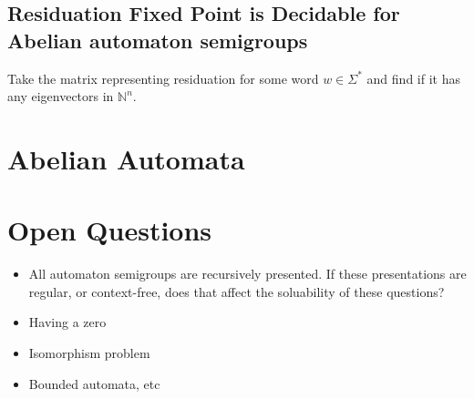 \documentclass[10pt]{article}
\begin{document}
\subsection{Residuation Fixed Point is Decidable for Abelian automaton
  semigroups}

Take the matrix representing residuation for some word
$w \in \Sigma^*$ and find if it has any eigenvectors in
$\mathbb{N}^n$.

\section{Abelian Automata}

\section{Open Questions}

\begin{itemize}
\item All automaton semigroups are recursively presented. If these
  presentations are regular, or context-free, does that affect the
  soluability of these questions?
\item Having a zero
\item Isomorphism problem
\item Bounded automata, etc
\end{itemize}

\nocite{*}

\end{document}
